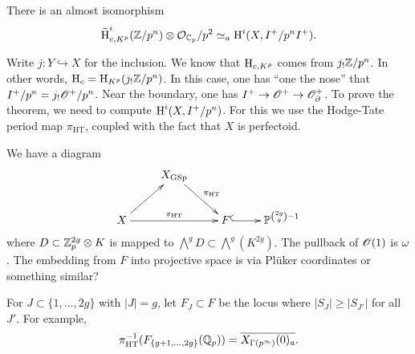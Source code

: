 \begin{proposition}
There is an almost isomorphism 
\[
  \widetilde {\operatorname{H}}_{c,K^p}^i(\mathbb{Z}/p^n) \otimes \mathcal{O}_{\mathbb{C}_p}/p^2 \simeq_a \operatorname{H}^i(X,I^+/p^n I^+) .
\]
\end{proposition}

Write $j:Y\hookrightarrow X$ for the inclusion. We know that 
$\operatorname{H}_{c,K^p}$ comes from $j_! \mathbb{Z}/p^n$. In other words, $\operatorname{H}_c=\operatorname{H}_{K^p}(j_! \mathbb{Z}/p^n)$. 
In this case, one has ``one the nose'' that 
$I^+/p^n = j_! \mathscr{O}^+/p^n$. Near the boundary, one has $I^+ \to \mathscr{O}^+ \to \mathscr{O}_\partial^+$. 
To prove the theorem, we need to compute $\operatorname{H}^i(X,I^+/p^n)$. For this we use the 
Hodge-Tate period map $\pi_\text{HT}$, coupled with the fact that $X$ is 
perfectoid. 

We have a diagram 
\[\xymatrix{
  & X_{\operatorname{GSp}} \ar[dr]^-{\pi_\text{HT}} \\
  X \ar[rr]^-{\pi_\text{HT}} \ar[ur] 
    & & F \ar@{^{(}->}[r] 
    & \dP^{\binom{2 g}{g}-1} 
}\]
where $D\subset \mathbb{Z}_p^{2 g}\otimes K$ is mapped to 
$\bigwedge^g D\subset \bigwedge^g(K^{2 g})$. The pullback of $\mathscr{O}(1)$ is $\omega$. 
The embedding from $F$ into projective space is via Pl\"uker coordinates or something 
similar? 

For $J\subset \{1,\dots,2 g\}$ with $|J|=g$, let $F_J\subset F$ be the locus where 
$|S_J|\geqslant |S_{J'}|$ for all $J'$. For example, 
\[
  \pi_\text{HT}^{-1}(F_{\{g+1,\dots,2 g\}}(\mathbb{Q}_p)) = \overline{X_{\Gamma(p^\infty)}(0)_a} .
\]

